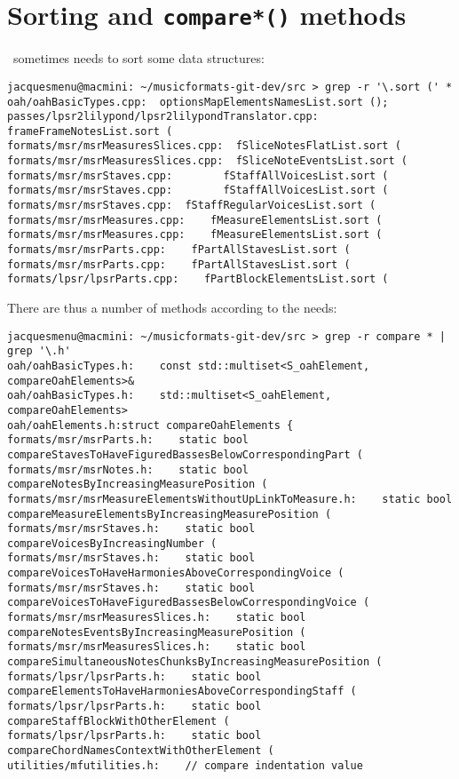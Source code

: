 \section{Sorting and {\tt compare*()} methods}

\mf\ sometimes needs to sort some data structures:
\begin{lstlisting}[language=Terminal]
jacquesmenu@macmini: ~/musicformats-git-dev/src > grep -r '\.sort (' *
oah/oahBasicTypes.cpp:  optionsMapElementsNamesList.sort ();
passes/lpsr2lilypond/lpsr2lilypondTranslator.cpp:    frameFrameNotesList.sort (
formats/msr/msrMeasuresSlices.cpp:  fSliceNotesFlatList.sort (
formats/msr/msrMeasuresSlices.cpp:  fSliceNoteEventsList.sort (
formats/msr/msrStaves.cpp:        fStaffAllVoicesList.sort (
formats/msr/msrStaves.cpp:        fStaffAllVoicesList.sort (
formats/msr/msrStaves.cpp:  fStaffRegularVoicesList.sort (
formats/msr/msrMeasures.cpp:    fMeasureElementsList.sort (
formats/msr/msrMeasures.cpp:    fMeasureElementsList.sort (
formats/msr/msrParts.cpp:    fPartAllStavesList.sort (
formats/msr/msrParts.cpp:    fPartAllStavesList.sort (
formats/lpsr/lpsrParts.cpp:    fPartBlockElementsList.sort (
\end{lstlisting}

There are thus a number of  methods according to the needs:
\begin{lstlisting}[language=Terminal]
jacquesmenu@macmini: ~/musicformats-git-dev/src > grep -r compare * | grep '\.h'
oah/oahBasicTypes.h:    const std::multiset<S_oahElement, compareOahElements>&
oah/oahBasicTypes.h:    std::multiset<S_oahElement, compareOahElements>
oah/oahElements.h:struct compareOahElements {
formats/msr/msrParts.h:    static bool           compareStavesToHaveFiguredBassesBelowCorrespondingPart (
formats/msr/msrNotes.h:    static bool           compareNotesByIncreasingMeasurePosition (
formats/msr/msrMeasureElementsWithoutUpLinkToMeasure.h:    static bool           compareMeasureElementsByIncreasingMeasurePosition (
formats/msr/msrStaves.h:    static bool           compareVoicesByIncreasingNumber (
formats/msr/msrStaves.h:    static bool           compareVoicesToHaveHarmoniesAboveCorrespondingVoice (
formats/msr/msrStaves.h:    static bool           compareVoicesToHaveFiguredBassesBelowCorrespondingVoice (
formats/msr/msrMeasuresSlices.h:    static bool           compareNotesEventsByIncreasingMeasurePosition (
formats/msr/msrMeasuresSlices.h:    static bool           compareSimultaneousNotesChunksByIncreasingMeasurePosition (
formats/lpsr/lpsrParts.h:    static bool           compareElementsToHaveHarmoniesAboveCorrespondingStaff (
formats/lpsr/lpsrParts.h:    static bool           compareStaffBlockWithOtherElement (
formats/lpsr/lpsrParts.h:    static bool           compareChordNamesContextWithOtherElement (
utilities/mfutilities.h:    // compare indentation value
\end{lstlisting}

